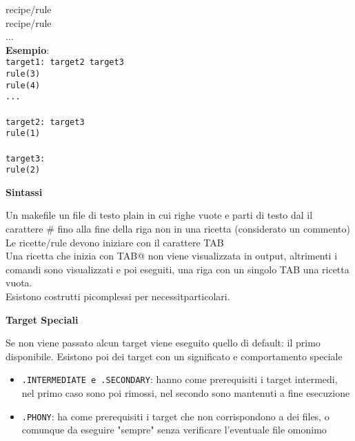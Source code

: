 \begin{flushleft}
\begin{flushleft}
{            \tab recipe/rule \\
            \tab recipe/rule \\
            \tab ...\\}
    \textbf{Esempio}:\\
    \texttt{target1: target2 target3 \\
            \tab rule(3)\\
            \tab rule(4) \\
            \tab ...\\
            \tab \\
            target2: target3 \\
            \tab rule(1) \\
            \tab \\ 
            target3:\\
            \tab rule(2)}
    \begin{flushleft}
      \textbf{Sintassi}\par
      Un makefile \ace un file di testo plain in cui righe vuote e parti di testo dal 
      il carattere \# fino alla fine della riga non  in una ricetta (considerato un commento)\\
      Le ricette/rule devono iniziare con il carattere TAB \\
      Una ricetta che inizia con TAB@ non viene visualizzata in output, altrimenti i 
      comandi sono visualizzati e poi eseguiti, una riga con un singolo TAB \ace una ricetta vuota.\\
      Esistono costrutti pi\acu complessi  per necessit\aca particolari. 
    \end{flushleft}
    \begin{flushleft}
      \textbf{Target Speciali}\par 
      Se non viene passato alcun target viene eseguito quello di default: il primo disponibile. 
      Esistono poi dei target con un significato e comportamento speciale 
      \begin{itemize}
        \item \texttt{.INTERMEDIATE e .SECONDARY}: hanno come prerequisiti i target intermedi, nel primo 
              caso sono poi rimossi, nel secondo sono mantenuti a fine esecuzione
        \item \texttt{.PHONY}: ha come prerequisiti i target che non corrispondono a dei files, o 
              comunque da eseguire "sempre" senza verificare l'eventuale file omonimo
      \end{itemize}

\end{flushleft}
\end{flushleft}
\end{flushleft}

